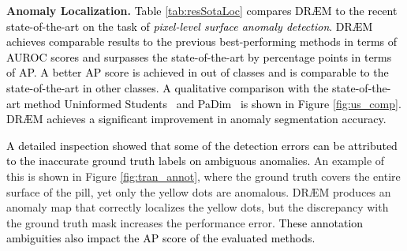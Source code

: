 \documentclass[10pt,twocolumn,letterpaper]{article}
\newcommand\ntxt[1]{\textcolor{black}{#1}}
\newcommand\ntext[1]{\textcolor{black}{#1}}
\begin{document}
\textbf{Anomaly Localization.} \ntext{Table \ref{tab:resSotaLoc} compares DR{\AE}M to the recent state-of-the-art  on the task of \emph{pixel-level surface anomaly detection}.} 
\ntxt{DR{\AE}M achieves comparable results to the previous best-performing methods in terms of AUROC scores and surpasses the state-of-the-art by  percentage points in terms of AP. A better AP score is achieved in  out of  classes and is comparable to the state-of-the-art in other classes. A qualitative comparison with the state-of-the-art method Uninformed Students~\cite{bergmann2020uninformed} and PaDim~\cite{defard2020padim} is shown in Figure \ref{fig:us_comp}. DR{\AE}M achieves a significant improvement in anomaly segmentation accuracy. }

\ntext{A detailed inspection showed that some of the detection errors can be attributed to the inaccurate ground truth labels on ambiguous anomalies.} An example of this is shown in Figure \ref{fig:tran_annot}, where the ground truth covers the entire surface of the pill, yet only the yellow dots are anomalous. DR{\AE}M produces an anomaly map that correctly localizes the yellow dots, but the discrepancy with the ground truth mask increases the performance error. \ntext{These annotation ambiguities also impact the AP score of the evaluated methods.}
\end{document}
